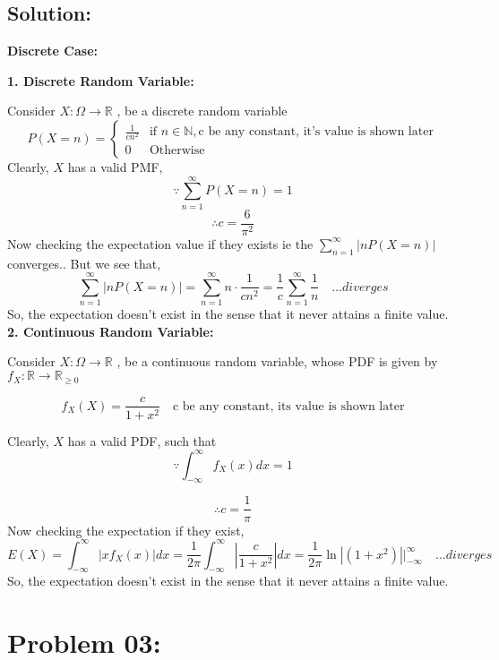 \documentclass{article}
\theoremstyle{definition}
\begin{document}
\subsection{Solution:}
\textbf{Discrete Case:}
\begin{comment}
    
Here, we can have a discrete random variable $X$, such that the following is the probability mass function, 
\[
f(x) = \frac{c}{x^2}
\]
\end{comment}


\textbf{1. Discrete Random Variable:}

Consider $X: \Omega \to \mathbb R$ , be a discrete random variable
\[
P(X=n) = \begin{cases}
        \frac{1}{cn^2} & \text{if } n \in \mathbb{N}, \text{c be any constant, it's value is shown later}\\
        0 & \text{Otherwise } 
    \end{cases}
\]
Clearly, $X$ has a valid PMF,
\[
\because \sum_{n=1}^{\infty} P(X=n) = 1
\]
\[
\therefore c = \frac{6}{\pi^2}
\]
Now checking the expectation value if they exists ie the $\sum_{n=1}^{\infty} |nP(X=n)|$ converges..
But we see that,
\[
\sum_{n=1}^{\infty} |nP(X=n)| = \sum_{n=1}^{\infty} n \cdot \frac{1}{cn^2} = \frac{1}{c}\sum_{n=1}^{\infty} \frac{1}{n} \quad \dots diverges
\]
So, the expectation doesn't exist in the sense that it never attains a finite value. \\


\textbf{2. Continuous Random Variable:}

Consider $X: \Omega \to \mathbb R$ , be a continuous random variable, whose PDF is given by $f_X : \mathbb R \to \mathbb R_{\geq 0}$


\[
f_X(X) = 
        \frac{c}{1 + x^2} \quad \text{c be any constant, its value is shown later}
\]

Clearly, $X$ has a valid PDF, such that
\[
\because \int_{-\infty}^{\infty} f_X (x) dx = 1
\]

\[
\therefore c = \frac{1}{\pi}
\]
Now checking the expectation if they exist,
\[
E(X) = \int_{-\infty}^{\infty} |xf_X (x)| dx = \frac{1}{2\pi} \int_{-\infty}^{\infty}|\frac{c}{1 + x^2} |dx = \frac{1}{2\pi} \ln{|(1+x^2)|}|_{-\infty}^{\infty} \quad \dots diverges
\]
So, the expectation doesn't exist in the sense that it never attains a finite value. 

\section{Problem 03:}
\end{document}
